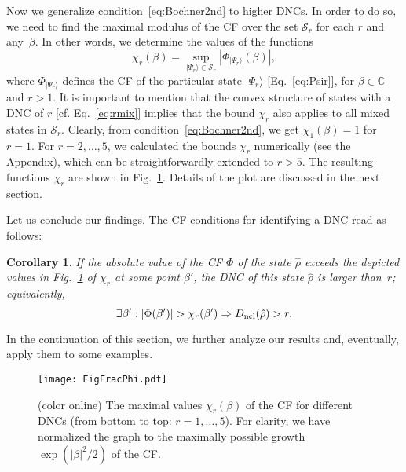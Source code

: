 \documentclass[aps,pra,twocolumn,showpacs,superscriptaddress,10pt]{revtex4-1}
\newtheorem{corollary}{Corollary}
\begin{document}
	Now we generalize condition~\eqref{eq:Bochner2nd} to higher DNCs.
	In order to do so, we need to find the maximal modulus of the CF over the set $\mathcal{S}_{r}$ for each $r$ and any~$\beta$.
	In other words, we determine the values of the functions
	\begin{equation}
		\chi_r(\beta)=\sup_{|\Psi_r\rangle\in\mathcal{S}_{r}}|\Phi_{|\Psi_r\rangle}(\beta)|,\label{eq:chir}
	\end{equation}
	where $\Phi_{|\Psi_r\rangle}$ defines the CF of the particular state $|\Psi_r\rangle$ [Eq.~\eqref{eq:Psir}], for $\beta\in\mathbb C$ and $r>1$.
	It is important to mention that the convex structure of states with a DNC of $r$ [cf. Eq.~\eqref{eq:rmix}] implies that the bound $\chi_r$ also applies to all mixed states in $\mathcal S_r$.
	Clearly, from condition~\eqref{eq:Bochner2nd}, we get $\chi_1(\beta)=1$ for $r=1$.
	For $r=2,\dots,5$, we calculated the bounds $\chi_r$ numerically (see the Appendix), which can be straightforwardly extended to $r>5$.
	The resulting functions $\chi_r$ are shown in Fig.~\ref{fig:fracPhi}.
	Details of the plot are discussed in the next section.

	Let us conclude our findings.
	The CF conditions for identifying a DNC read as follows:
	\begin{corollary}
		If the absolute value of the CF $\Phi$ of the state $\hat{\rho}$ exceeds the depicted values in Fig.~\ref{fig:fracPhi} of $\chi_{r}$ at some point $\beta'$, the DNC of this state $\hat{\rho}$ is larger than~$r$; equivalently,
		\begin{equation}
			\exists\beta': |\Phi(\beta')|>\chi_{r}(\beta')\Rightarrow D_{\rm ncl}(\hat{\rho})>r.\label{eq:criteria}
		\end{equation}
	\end{corollary}
	In the continuation of this section, we further analyze our results and, eventually, apply them to some examples.
	
\begin{figure}[ht]
	\texttt{[image: FigFracPhi.pdf]}
	\caption{(color online)
		The maximal values $\chi_r(\beta)$ of the CF for different DNCs (from bottom to top: $r=1,\dots,5$).
		For clarity, we have normalized the graph to the maximally possible growth $\exp(|\beta|^2/2)$ of the CF.
		}\label{fig:fracPhi}
\end{figure}
\end{document}
